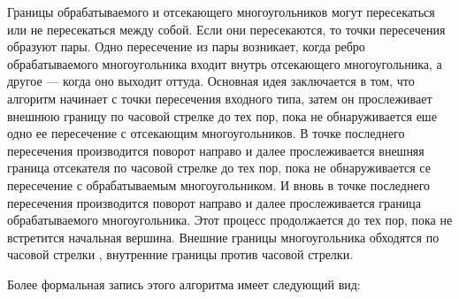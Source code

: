\documentclass[12pt]{article}
\begin{document}
 Границы обрабатываемого и отсекающего многоугольников могут
пересекаться или не пересекаться между собой. Если они пересекаются, то точки пересечения образуют
пары. Одно пересечение из пары возникает, когда ребро обрабатываемого многоугольника входит внутрь
отсекающего многоугольника, а другое — когда оно выходит оттуда. Основная идея заключается в том,
что алгоритм начинает с точки пересечения входного типа, затем он прослеживает внешнюю границу по
часовой стрелке до тех пор, пока не обнаруживается еше одно ее пересечение с отсекающим многоугольников. В точке последнего пересечения производится поворот направо и далее прослеживается внешняя
граница отсекателя по часовой стрелке до тех пор, пока не обнаруживается се пересечение с обрабатываемым многоугольником. И вновь в точке последнего пересечения производится поворот направо и далее прослеживается граница обрабатываемого многоугольника. Этот процесс продолжается до тех пор, пока не встретится начальная вершина. Внешние границы многоугольника обходятся по часовой стрелки ,  внутренние границы против часовой стрелки.




Более формальная запись этого алгоритма имеет следующий вид:
\end{document}

